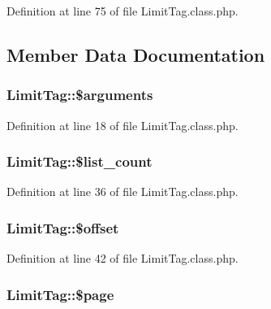 Definition at line 75 of file Limit\-Tag.\-class.\-php.



\subsection{Member Data Documentation}
\hypertarget{classLimitTag_aca5deed1e4200fbc10bf96b3af1bb0aa}{
\subsubsection[{\$arguments}]{\setlength{\rightskip}{0pt plus 5cm}Limit\-Tag\-::\$arguments}}\label{classLimitTag_aca5deed1e4200fbc10bf96b3af1bb0aa}


Definition at line 18 of file Limit\-Tag.\-class.\-php.

\hypertarget{classLimitTag_aec51c8433d2e7a1e009b7c331702cef0}{
\subsubsection[{\$list\-\_\-count}]{\setlength{\rightskip}{0pt plus 5cm}Limit\-Tag\-::\$list\-\_\-count}}\label{classLimitTag_aec51c8433d2e7a1e009b7c331702cef0}


Definition at line 36 of file Limit\-Tag.\-class.\-php.

\hypertarget{classLimitTag_adbc76de9e00e8d0a724e49dec7e208ae}{
\subsubsection[{\$offset}]{\setlength{\rightskip}{0pt plus 5cm}Limit\-Tag\-::\$offset}}\label{classLimitTag_adbc76de9e00e8d0a724e49dec7e208ae}


Definition at line 42 of file Limit\-Tag.\-class.\-php.

\hypertarget{classLimitTag_aae0faff40b6bcd38d72350bd851ecd4b}{
\subsubsection[{\$page}]{\setlength{\rightskip}{0pt plus 5cm}Limit\-Tag\-::\$page}}\label{classLimitTag_aae0faff40b6bcd38d72350bd851ecd4b}


